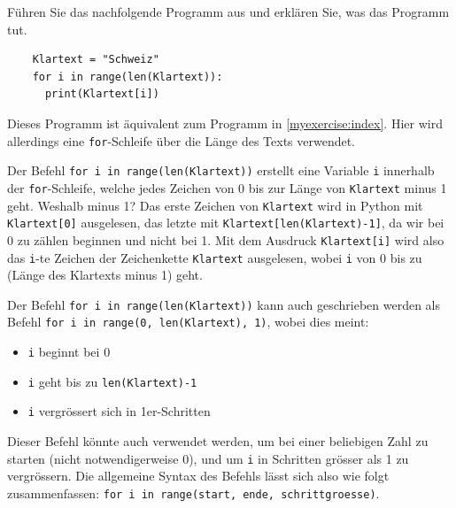 \begin{myexercise}
	Führen Sie das nachfolgende Programm aus und erklären Sie, was das Programm tut.
	\begin{lstlisting}
    Klartext = "Schweiz"
    for i in range(len(Klartext)):
      print(Klartext[i])
  \end{lstlisting}
	\begin{myanswer}
		Dieses Programm ist äquivalent zum Programm in \cref{myexercise:index}.
		Hier wird allerdings eine \lstinline|for|-Schleife über die Länge des Texts verwendet.
	\end{myanswer}
\end{myexercise}

Der Befehl \lstinline|for i in range(len(Klartext))| erstellt eine Variable \lstinline|i| innerhalb der \lstinline|for|-Schleife, welche jedes Zeichen von 0 bis zur Länge von \lstinline|Klartext| minus 1 geht. Weshalb minus 1? Das erste Zeichen von \lstinline|Klartext| wird in Python mit \lstinline|Klartext[0]| ausgelesen, das letzte mit \lstinline|Klartext[len(Klartext)-1]|, da wir bei 0 zu zählen beginnen und nicht bei 1. Mit dem Ausdruck \lstinline|Klartext[i]| wird also das \lstinline|i|-te Zeichen der Zeichenkette \lstinline|Klartext| ausgelesen, wobei \lstinline|i| von 0 bis zu (Länge des Klartexts minus 1) geht.

Der Befehl \lstinline|for i in range(len(Klartext))| kann auch geschrieben werden als Befehl \lstinline|for i in range(0, len(Klartext), 1)|, wobei dies meint:
\begin{itemize}
	\item \lstinline|i| beginnt bei 0
	\item \lstinline|i| geht bis zu \lstinline|len(Klartext)-1|
	\item \lstinline|i| vergrössert sich in 1er-Schritten
\end{itemize}
Dieser Befehl könnte auch verwendet werden, um bei einer beliebigen Zahl zu starten (nicht notwendigerweise 0), und um \lstinline|i| in Schritten grösser als 1 zu vergrössern. Die allgemeine Syntax des Befehls lässt sich also wie folgt zusammenfassen: \lstinline|for i in range(start, ende, schrittgroesse)|.

